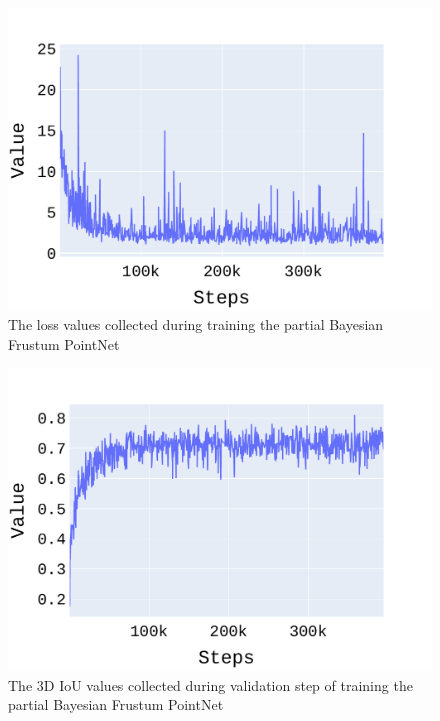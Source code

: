 \documentclass[10pt,twocolumn,letterpaper]{article}
\begin{document}
\begin{figure}[!htbp]
	\centering
	\includegraphics[scale = 0.4]{./images/Part-Bayesian F_Pointnet_Results/loss.pdf}
	\caption{The loss values collected during training the partial Bayesian Frustum PointNet}
	\label{fig:loss_PBF-PointNet}
\end{figure}

\begin{figure}[!htbp]
	\centering
	\includegraphics[scale = 0.4]{./images/Part-Bayesian F_Pointnet_Results/iou_3d.pdf}
	\caption{The 3D IoU values collected during validation step of training the partial Bayesian Frustum PointNet}
	\label{fig:IoU_PBF-PointNet}
\end{figure}
\end{document}
